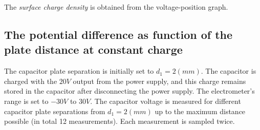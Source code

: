 The \textit{surface charge density} is obtained from the voltage-position graph.

\subsection{The potential difference as function of the plate distance at constant charge}

The capacitor plate separation is initially set to $d_{1} = 2 (mm)$. The capacitor is charged with the $20V$ output from the power supply, and this charge remains stored in the capacitor after disconnecting the power supply. The electrometer's range is set to $-30V$ to $30V$. The capacitor voltage is measured for different capacitor plate separations from $d_{1} = 2 (mm)$ up to the maximum distance possible (in total 12 measurements). Each measurement is sampled twice.  

